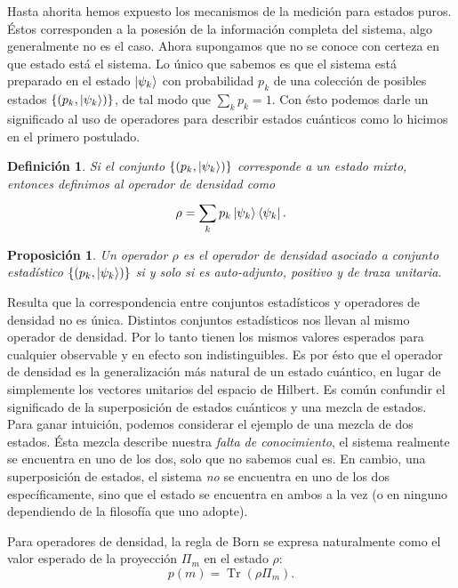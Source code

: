 \documentclass[a4paper]{report}
\DeclareMathOperator{\Tr}{Tr}
\newtheorem{definition}{Definición}
\newtheorem{proposition}{Proposición}
\begin{document}
  Hasta ahorita hemos expuesto los mecanismos de la medición
  para estados puros. Éstos corresponden a la posesión de la
  información completa del sistema, algo generalmente no es
  el caso. Ahora supongamos que no se conoce con certeza en
  que estado está el sistema. Lo único que sabemos es que el
  sistema está preparado en el estado $\ket{\psi_k}$ con
  probabilidad $p_k$ de una colección de posibles estados
  $\{(p_k, \ket{\psi_k})\}$, de tal modo que $\sum_{k}^{}
  p_k = 1$. Con ésto podemos darle un significado al uso de
  operadores para describir estados cuánticos como lo
  hicimos en el primero postulado.
  \begin{definition}
    \label{def:density_operator}
    Si el conjunto $\{(p_k, \ket{\psi_k})\}$ corresponde a
    un estado mixto, entonces definimos al operador de
    densidad como 
    \begin{equation}
      \rho 
      = \sum_{k}^{} p_k \ket{\psi_k}\bra{\psi_k}.
    \end{equation}
  \end{definition}
  \begin{proposition}
    Un operador $\rho$ es el operador de densidad asociado a
    conjunto estadístico $\{(p_k, \ket{\psi_k})\}$ si y solo
    si es auto-adjunto, positivo y de traza unitaria.
  \end{proposition}
  Resulta que la correspondencia entre conjuntos
  estadísticos y operadores de densidad no es única.
  Distintos conjuntos estadísticos nos llevan al mismo
  operador de densidad. Por lo tanto tienen los mismos
  valores esperados para cualquier observable y en efecto
  son indistinguibles. Es por ésto que el operador de
  densidad es la generalización más natural de un estado
  cuántico, en lugar de simplemente los vectores unitarios
  del espacio de Hilbert. Es común confundir el significado
  de la superposición de estados cuánticos y una mezcla de
  estados. Para ganar intuición, podemos considerar el
  ejemplo de una mezcla de dos estados. Ésta mezcla describe
  nuestra \textit{falta de conocimiento}, el sistema
  realmente se encuentra en uno de los dos, solo que no
  sabemos cual es. En cambio, una superposición de estados,
  el sistema \textit{no} se encuentra en uno de los dos
  específicamente, sino que el estado se encuentra en ambos
  a la vez (o en ninguno dependiendo de la filosofía que uno
  adopte).

  Para operadores de densidad, la regla de Born se expresa
  naturalmente como el valor esperado de la proyección
  $\Pi_m$ en el estado $\rho$:
  \begin{equation}
    p(m) = \Tr\left( \rho \Pi_m \right). 
  \end{equation}
\end{document}
